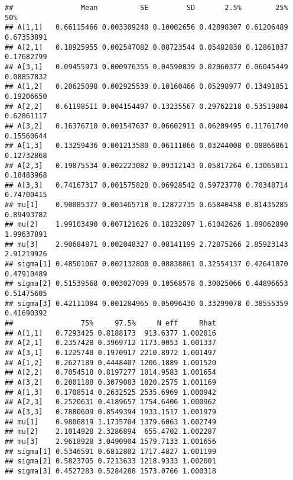 \documentclass[
]{article}
\begin{document}
\begin{verbatim}
##                Mean          SE         SD       2.5%        25%        50%
## A[1,1]   0.66115466 0.003309240 0.10002656 0.42898307 0.61206489 0.67353891
## A[2,1]   0.18925955 0.002547082 0.08723544 0.05482830 0.12861037 0.17682799
## A[3,1]   0.09455973 0.000976355 0.04590839 0.02060377 0.06045449 0.08857832
## A[1,2]   0.20625098 0.002925539 0.10160466 0.05298977 0.13491851 0.19206650
## A[2,2]   0.61198511 0.004154497 0.13235567 0.29762218 0.53519804 0.62861117
## A[3,2]   0.16376710 0.001547637 0.06602911 0.06209495 0.11761740 0.15560644
## A[1,3]   0.13259436 0.001213580 0.06111066 0.03244008 0.08866861 0.12732868
## A[2,3]   0.19875534 0.002223082 0.09312143 0.05817264 0.13065011 0.18483968
## A[3,3]   0.74167317 0.001575828 0.06928542 0.59723770 0.70348714 0.74700415
## mu[1]    0.90085377 0.003465718 0.12872735 0.65840458 0.81435285 0.89493782
## mu[2]    1.99103490 0.007121626 0.18232897 1.61042626 1.89062890 1.99637891
## mu[3]    2.90684871 0.002048327 0.08141199 2.72875266 2.85923143 2.91219926
## sigma[1] 0.48501067 0.002132800 0.08838861 0.32554137 0.42641070 0.47910489
## sigma[2] 0.51539568 0.003027099 0.10568578 0.30025066 0.44896653 0.51475605
## sigma[3] 0.42111084 0.001284965 0.05096430 0.33299078 0.38555359 0.41690392
##                75%     97.5%     N_eff     Rhat
## A[1,1]   0.7293425 0.8188173  913.6377 1.002816
## A[2,1]   0.2357428 0.3969712 1173.0053 1.001337
## A[3,1]   0.1225740 0.1970917 2210.8972 1.001497
## A[1,2]   0.2627189 0.4448407 1206.1889 1.001520
## A[2,2]   0.7054518 0.8197277 1014.9583 1.001654
## A[3,2]   0.2001188 0.3079083 1820.2575 1.001169
## A[1,3]   0.1708514 0.2632525 2535.6969 1.000942
## A[2,3]   0.2520631 0.4189657 1754.6406 1.000962
## A[3,3]   0.7880609 0.8549394 1933.1517 1.001979
## mu[1]    0.9806819 1.1735704 1379.6063 1.002749
## mu[2]    2.1014928 2.3286894  655.4702 1.002287
## mu[3]    2.9618928 3.0490904 1579.7133 1.001656
## sigma[1] 0.5346591 0.6812802 1717.4827 1.001199
## sigma[2] 0.5823705 0.7213633 1218.9333 1.002001
## sigma[3] 0.4527283 0.5284288 1573.0766 1.000318
\end{verbatim}
\end{document}

